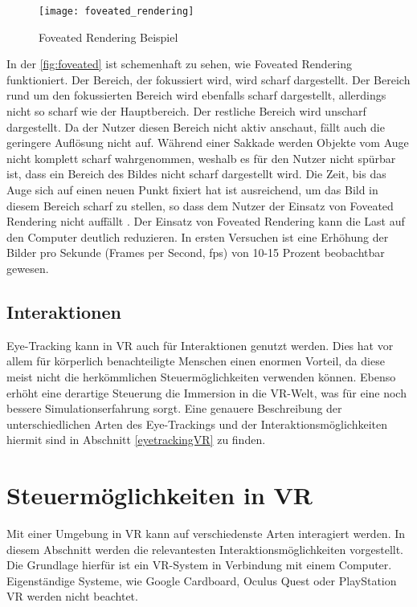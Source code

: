 \begin{figure}
	\centering
	\texttt{[image: foveated\_rendering]}
	\caption[Foveated Rendering Beispiel]{Foveated Rendering Beispiel \cite{Albert.2017}}
	\label{fig:foveated}
\end{figure}

In der \autoref{fig:foveated} ist schemenhaft zu sehen, wie Foveated Rendering funktioniert. Der Bereich, der fokussiert wird, wird scharf dargestellt. Der Bereich rund um den fokussierten Bereich wird ebenfalls scharf dargestellt, allerdings nicht so scharf wie der Hauptbereich.  Der restliche Bereich wird unscharf dargestellt. Da der Nutzer diesen Bereich nicht aktiv anschaut, fällt auch die geringere Auflösung nicht auf. Während einer Sakkade werden Objekte vom Auge nicht komplett scharf wahrgenommen, weshalb es für den Nutzer nicht spürbar ist, dass ein Bereich des Bildes nicht scharf dargestellt wird. Die Zeit, bis das Auge sich auf einen neuen Punkt fixiert hat ist ausreichend, um das Bild in diesem Bereich scharf zu stellen, so dass dem Nutzer der Einsatz von Foveated Rendering nicht auffällt \cite{Albert.2017}. Der Einsatz von Foveated Rendering kann die Last auf den Computer deutlich reduzieren. In ersten Versuchen ist eine Erhöhung der Bilder pro Sekunde (Frames per Second, fps) von 10-15 Prozent beobachtbar gewesen. \cite{H.Kim.2018}

\subsection{Interaktionen}
Eye-Tracking kann in \ac{VR} auch für Interaktionen genutzt werden. Dies hat vor allem für körperlich benachteiligte Menschen einen enormen Vorteil, da diese meist nicht die herkömmlichen Steuermöglichkeiten verwenden können. Ebenso erhöht eine derartige Steuerung die Immersion in die \ac{VR}-Welt, was für eine noch bessere Simulationserfahrung sorgt. Eine genauere Beschreibung der unterschiedlichen Arten des Eye-Trackings und der Interaktionsmöglichkeiten hiermit sind in Abschnitt \ref{eyetrackingVR} zu finden.

\section{Steuermöglichkeiten in VR}
Mit einer Umgebung in \ac{VR} kann auf verschiedenste Arten interagiert werden. In diesem Abschnitt werden die relevantesten Interaktionsmöglichkeiten vorgestellt. Die Grundlage hierfür ist ein \ac{VR}-System in Verbindung mit einem Computer. Eigenständige Systeme, wie Google Cardboard, Oculus Quest oder PlayStation \ac{VR} werden nicht beachtet.

